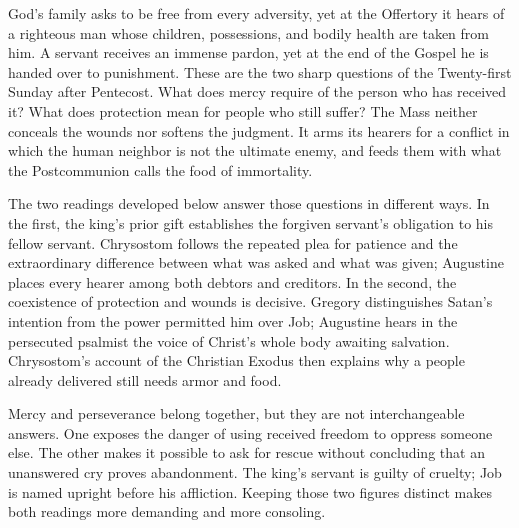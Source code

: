 God's family asks to be free from every adversity, yet at the Offertory it
hears of a righteous man whose children, possessions, and bodily health are
taken from him. A servant receives an immense pardon, yet at the end of the
Gospel he is handed over to punishment. These are the two sharp questions
of the Twenty-first Sunday after Pentecost. What does mercy require of the
person who has received it? What does protection mean for people who still
suffer? The Mass neither conceals the wounds nor softens the judgment. It
arms its hearers for a conflict in which the human neighbor is not the
ultimate enemy, and feeds them with what the Postcommunion calls the food
of immortality.

The two readings developed below answer those questions in different ways.
In the first, the king's prior gift establishes the forgiven servant's
obligation to his fellow servant. Chrysostom follows the repeated plea for
patience and the extraordinary difference between what was asked and what
was given; Augustine places every hearer among both debtors and creditors.
In the second, the coexistence of protection and wounds is decisive.
Gregory distinguishes Satan's intention from the power permitted him over
Job; Augustine hears in the persecuted psalmist the voice of Christ's
whole body awaiting salvation. Chrysostom's account of the Christian Exodus
then explains why a people already delivered still needs armor and food.

Mercy and perseverance belong together, but they are not interchangeable
answers. One exposes the danger of using received freedom to oppress
someone else. The other makes it possible to ask for rescue without
concluding that an unanswered cry proves abandonment. The king's servant
is guilty of cruelty; Job is named upright before his affliction. Keeping
those two figures distinct makes both readings more demanding and more
consoling.

